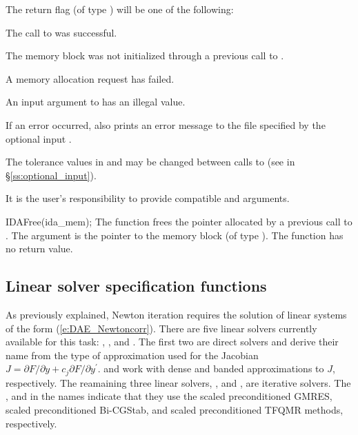 {
  The return flag  (of type ) will be one of the following:
  \begin{args}
  \item[\Id{IDA\_SUCCESS}]
    The call to  was successful.
  \item[\Id{IDA\_MEM\_NULL}] 
    The {\ida} memory block was not initialized through a previous call to .
  \item[\Id{IDA\_MEM\_FAIL}] 
    A memory allocation request has failed.
  \item[\Id{IDA\_ILL\_INPUT}] 
    An input argument to  has an illegal value.
  \end{args}
}
{
  If an error occurred,  also prints an error message to the
  file specified by the optional input .

  The tolerance values in  and  may be changed between
  calls to  (see  in \S\ref{ss:optional_input}).

  {\warn} It is the user's responsibility to provide compatible  and
   arguments.
}
{
  IDAFree(ida\_mem);
}
{
  The function  frees the pointer allocated by
  a previous call to .
}
{
  The argument is the pointer to the {\ida} memory block (of type ).
}
{
  The function  has no return value.
}
{}
\subsection{Linear solver specification functions}\label{sss:lin_solv_init}

As previously explained, Newton iteration requires the solution of
linear systems of the form (\ref{e:DAE_Newtoncorr}).  There are five {\ida} linear
solvers currently available for this task: {\idadense}, {\idaband}, 
and {\idaspgmr}.  The first two are direct solvers and derive their name
from the type of approximation used for the Jacobian 
$J = \partial{F}/\partial{y} + c_j \partial{F}/\partial{y^\prime}$.
{\idadense} and {\idaband} work with
dense and banded approximations to $J$, respectively.  The reamaining three
{\ida} linear solvers, {\idaspgmr}, {\idaspbcg} and {\idasptfqmr}, are iterative solvers.
The {\spgmr}, {\spbcg} and {\sptfqmr} in the names indicate that they use the scaled preconditioned
GMRES, scaled preconditioned Bi-CGStab, and scaled preconditioned TFQMR methods, respectively.

